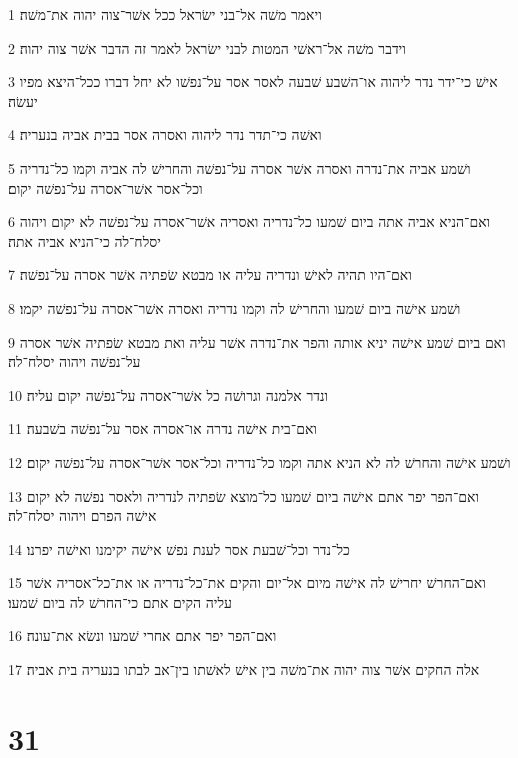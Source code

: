 \par 1 ויאמר משׁה אל־בני ישׂראל ככל אשׁר־צוה יהוה את־משׁה׃
\par 2 וידבר משׁה אל־ראשׁי המטות לבני ישׂראל לאמר זה הדבר אשׁר צוה יהוה׃
\par 3 אישׁ כי־ידר נדר ליהוה או־השׁבע שׁבעה לאסר אסר על־נפשׁו לא יחל דברו ככל־היצא מפיו יעשׂה׃
\par 4 ואשׁה כי־תדר נדר ליהוה ואסרה אסר בבית אביה בנעריה׃
\par 5 ושׁמע אביה את־נדרה ואסרה אשׁר אסרה על־נפשׁה והחרישׁ לה אביה וקמו כל־נדריה וכל־אסר אשׁר־אסרה על־נפשׁה יקום׃
\par 6 ואם־הניא אביה אתה ביום שׁמעו כל־נדריה ואסריה אשׁר־אסרה על־נפשׁה לא יקום ויהוה יסלח־לה כי־הניא אביה אתה׃
\par 7 ואם־היו תהיה לאישׁ ונדריה עליה או מבטא שׂפתיה אשׁר אסרה על־נפשׁה׃
\par 8 ושׁמע אישׁה ביום שׁמעו והחרישׁ לה וקמו נדריה ואסרה אשׁר־אסרה על־נפשׁה יקמו׃
\par 9 ואם ביום שׁמע אישׁה יניא אותה והפר את־נדרה אשׁר עליה ואת מבטא שׂפתיה אשׁר אסרה על־נפשׁה ויהוה יסלח־לה׃
\par 10 ונדר אלמנה וגרושׁה כל אשׁר־אסרה על־נפשׁה יקום עליה׃
\par 11 ואם־בית אישׁה נדרה או־אסרה אסר על־נפשׁה בשׁבעה׃
\par 12 ושׁמע אישׁה והחרשׁ לה לא הניא אתה וקמו כל־נדריה וכל־אסר אשׁר־אסרה על־נפשׁה יקום׃
\par 13 ואם־הפר יפר אתם אישׁה ביום שׁמעו כל־מוצא שׂפתיה לנדריה ולאסר נפשׁה לא יקום אישׁה הפרם ויהוה יסלח־לה׃
\par 14 כל־נדר וכל־שׁבעת אסר לענת נפשׁ אישׁה יקימנו ואישׁה יפרנו׃
\par 15 ואם־החרשׁ יחרישׁ לה אישׁה מיום אל־יום והקים את־כל־נדריה או את־כל־אסריה אשׁר עליה הקים אתם כי־החרשׁ לה ביום שׁמעו׃
\par 16 ואם־הפר יפר אתם אחרי שׁמעו ונשׂא את־עונה׃
\par 17 אלה החקים אשׁר צוה יהוה את־משׁה בין אישׁ לאשׁתו בין־אב לבתו בנעריה בית אביה׃

\chapter{31}

